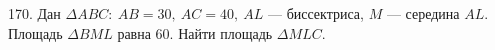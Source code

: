 170. Дан $\Delta ABC:\ AB=30,\ AC=40,\ AL$ --- биссектриса, $M$ --- середина $AL.$ Площадь $\Delta BML$ равна 60. Найти площадь $\Delta MLC.$\\

